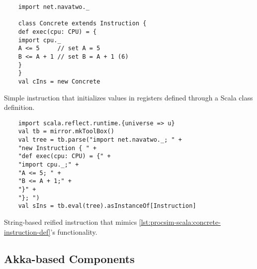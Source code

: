 \begin{listing}[ht!]
\begin{minipage}{0.45\textwidth}
    \begin{verbatim}
    import net.navatwo._
    
    class Concrete extends Instruction {
    def exec(cpu: CPU) = {
    import cpu._
    A <= 5     // set A = 5
    B <= A + 1 // set B = A + 1 (6)
    }
    }
    val cIns = new Concrete
    \end{verbatim}
    \caption{Simple instruction that initializes values in registers defined through a Scala class definition.}
    \label{lst:procsim-scala:concrete-instruction-def}
\end{minipage}
\begin{minipage}{0.45\textwidth}
    \begin{verbatim}
    import scala.reflect.runtime.{universe => u}
    val tb = mirror.mkToolBox()
    val tree = tb.parse("import net.navatwo._; " +
    "new Instruction { " +
    "def exec(cpu: CPU) = {" +
    "import cpu._;" +
    "A <= 5; " +
    "B <= A + 1;" +
    "}" +
    "}; ")
    val sIns = tb.eval(tree).asInstanceOf[Instruction]
    \end{verbatim}
    \caption{String-based reified instruction that mimics \cref{lst:procsim-scala:concrete-instruction-def}'s functionality.}
    \label{lst:procsim-scala:reify-instruction-def}
\end{minipage}
\end{listing}

\subsection{Akka-based Components}

